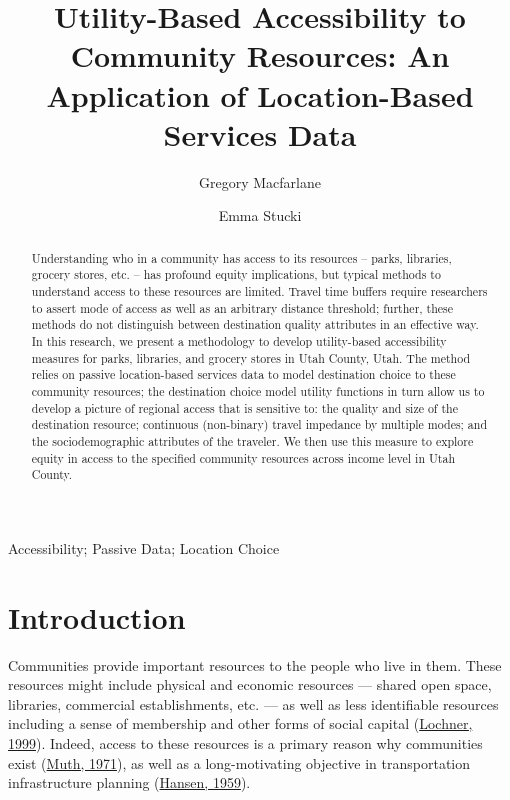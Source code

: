 \documentclass[3p, authoryear, review]{elsarticle} %
\begin{document}
\begin{frontmatter}

  \title{Utility-Based Accessibility to Community Resources: An Application of Location-Based Services Data}
    \author[BYU]{Gregory Macfarlane}
    \author[BYU]{Emma Stucki}
      \address[BYU]{Brigham Young University, Civil and Construction Engineering Department, 430 Engineering Building, Provo, Utah 84602}
  
  \begin{abstract}
  Understanding who in a community has access to its resources -- parks, libraries,
  grocery stores, etc. -- has profound equity implications, but typical methods
  to understand access to these resources are limited. Travel time buffers require
  researchers to assert mode of access as well as an arbitrary distance threshold;
  further, these methods do not distinguish between destination quality attributes
  in an effective way. In this research, we present a methodology to develop
  utility-based accessibility measures for parks, libraries, and grocery stores
  in Utah County, Utah. The method relies on passive location-based services data
  to model destination choice to these community resources; the destination choice
  model utility functions in turn allow us to develop a picture of regional access
  that is sensitive to: the quality and size of the destination resource;
  continuous (non-binary) travel impedance by multiple modes; and the
  sociodemographic attributes of the traveler. We then use this measure
  to explore equity in access to the specified community resources across
  income level in Utah County.
  \end{abstract}
   \begin{keyword} Accessibility; Passive Data; Location Choice\end{keyword}
 \end{frontmatter}

\hypertarget{intro}{%
\section{Introduction}\label{intro}}

Communities provide important resources to the people who live in them. These
resources might include physical and economic resources
--- shared open space, libraries, commercial establishments, etc. --- as well as less identifiable resources
including a sense of membership and other forms of social capital
(\protect\hyperlink{ref-lochner1999}{Lochner, 1999}). Indeed, access to these resources is a primary reason why
communities exist (\protect\hyperlink{ref-muth1971}{Muth, 1971}), as well as a long-motivating objective in
transportation infrastructure planning (\protect\hyperlink{ref-hansen1959}{Hansen, 1959}).
\end{document}
